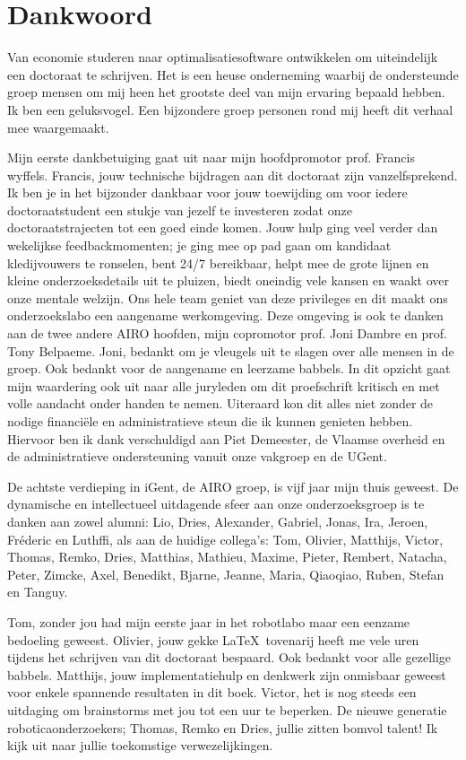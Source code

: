 \documentclass[\home/main.tex]{subfiles}
\begin{document}
\chapter{Dankwoord}

Van economie studeren naar optimalisatiesoftware ontwikkelen om uiteindelijk een doctoraat te schrijven.
Het is een heuse onderneming waarbij de ondersteunde groep mensen om mij heen het grootste deel van mijn ervaring bepaald hebben.
Ik ben een geluksvogel. Een bijzondere groep personen rond mij heeft dit verhaal mee waargemaakt.

Mijn eerste dankbetuiging gaat uit naar mijn hoofdpromotor prof. Francis wyffels.
Francis, jouw technische bijdragen aan dit doctoraat zijn vanzelfsprekend. Ik ben je in het bijzonder dankbaar voor jouw toewijding om voor iedere doctoraatstudent een stukje van jezelf te investeren zodat onze doctoraatstrajecten tot een goed einde komen.
Jouw hulp ging veel verder dan wekelijkse feedbackmomenten; je ging mee op pad gaan om kandidaat kledijvouwers te ronselen, bent 24/7 bereikbaar, helpt mee de grote lijnen en kleine onderzoeksdetails uit te pluizen, biedt oneindig vele kansen en waakt over onze mentale welzijn.
Ons hele team geniet van deze privileges en dit maakt ons onderzoekslabo een aangename werkomgeving. Deze omgeving is ook te danken aan de twee andere AIRO hoofden, mijn copromotor prof. Joni Dambre en prof. Tony Belpaeme. Joni, bedankt om je vleugels uit te slagen over alle mensen in de groep. Ook bedankt voor de aangename en leerzame babbels. In dit opzicht gaat mijn waardering ook uit naar alle juryleden om dit proefschrift kritisch en met volle aandacht onder handen te nemen.
Uiteraard kon dit alles niet zonder de nodige financiële en administratieve steun die ik kunnen genieten hebben. Hiervoor ben ik dank verschuldigd aan Piet Demeester, de Vlaamse overheid en de administratieve ondersteuning vanuit onze vakgroep en de UGent.

De achtste verdieping in iGent, de AIRO groep, is vijf jaar mijn thuis geweest. De dynamische en intellectueel uitdagende sfeer aan onze onderzoeksgroep is te danken aan zowel alumni: Lio, Dries, Alexander, Gabriel, Jonas, Ira, Jeroen, Fréderic en Luthffi, als aan de huidige collega's: Tom, Olivier, Matthijs, Victor, Thomas, Remko, Dries, Matthias, Mathieu, Maxime, Pieter, Rembert, Natacha, Peter, Zimcke, Axel, Benedikt, Bjarne, Jeanne, Maria, Qiaoqiao, Ruben, Stefan en Tanguy.

Tom, zonder jou had mijn eerste jaar in het robotlabo maar een eenzame bedoeling geweest. Olivier, jouw gekke \LaTeX\ tovenarij heeft me vele uren tijdens het schrijven van dit doctoraat bespaard. Ook bedankt voor alle gezellige babbels.
Matthijs, jouw implementatiehulp en denkwerk zijn onmisbaar geweest voor enkele spannende resultaten in dit boek.
Victor, het is nog steeds een uitdaging om brainstorms met jou tot een uur te beperken.
De nieuwe generatie roboticaonderzoekers; Thomas, Remko en Dries, jullie zitten bomvol talent! Ik kijk uit naar jullie toekomstige verwezelijkingen.
\end{document}
